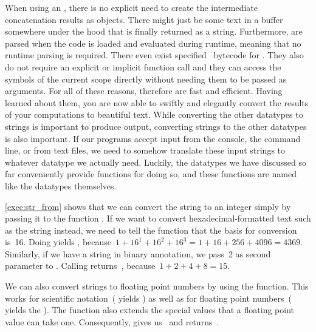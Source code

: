 When using an , there is no explicit need to create the intermediate concatenation results as objects.
There might just be some text in a buffer somewhere under the hood that is finally returned as a string.
Furthermore,  are parsed when the code is loaded and evaluated during runtime, meaning that no runtime parsing is required.
There even exist specified \python\ bytecode for .
They also do not require an explicit or implicit function call and they can access the symbols of the current scope directly without needing them to be passed as arguments.
For all of these reasons,  therefore are fast and efficient.
Having learned about them, you are now able to swiftly and elegantly convert the results of your computations to beautiful text.%
\FloatBarrier%
\endhsection%
%
%
%
%
%
%
While converting the other datatypes to strings is important to produce output, converting strings to the other datatypes is also important.
If our programs accept input from the console, the command line, or from text files, we need to somehow translate these input strings to whatever datatype we actually need.
Luckily, the datatypes we have discussed so far conveniently provide functions for doing so, and these functions are named like the datatypes themselves.

\cref{exec:str_from} shows that we can convert the string  to an integer  simply by passing it to the function .
If we want to convert hexadecimal-formatted text such as the string  instead, we need to tell the  function that the basis for conversion is~16.
Doing  yields , because~$1+16^1+16^2+16^3=1+16+256+4096=4369$.
Similarly, if we have a string in binary annotation, we pass~2 as second parameter to .
Calling  returns~, because~$1+2+4+8=15$.

We can also convert strings to floating point numbers by using the  function.
This works for scientific notation~( yields ) as well as for  floating point numbers~( yields the  ).
The  function also extends the special values that a floating point value can take one.
Consequently,  gives us~ and  returns~.

